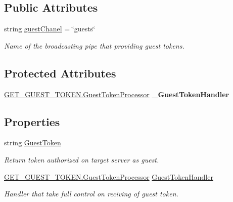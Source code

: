 \subsection*{Public Attributes}
\begin{DoxyCompactItemize}
\item 
string \mbox{\hyperlink{class_pipes_provider_1_1_networking_1_1_routing_1_1_partial_authorized_instruction_abda0735bb8ca245802008413dd50c863}{guest\+Chanel}} = \char`\"{}guests\char`\"{}
\begin{DoxyCompactList}\small\item\em Name of the broadcasting pipe that providing guest tokens. \end{DoxyCompactList}\end{DoxyCompactItemize}
\subsection*{Protected Attributes}
\begin{DoxyCompactItemize}
\item 
\mbox{\label{class_pipes_provider_1_1_networking_1_1_routing_1_1_partial_authorized_instruction_aef955c1b8751ba406a3b55a7155979c0}} 
\mbox{\hyperlink{class_base_queries_1_1_g_e_t___g_u_e_s_t___t_o_k_e_n_1_1_guest_token_processor}{G\+E\+T\+\_\+\+G\+U\+E\+S\+T\+\_\+\+T\+O\+K\+E\+N.\+Guest\+Token\+Processor}} {\bfseries \+\_\+\+Guest\+Token\+Handler}
\end{DoxyCompactItemize}
\subsection*{Properties}
\begin{DoxyCompactItemize}
\item 
string \mbox{\hyperlink{class_pipes_provider_1_1_networking_1_1_routing_1_1_partial_authorized_instruction_a0818427091144916faf74dab51ac1ba8}{Guest\+Token}}
\begin{DoxyCompactList}\small\item\em Return token authorized on target server as guest. \end{DoxyCompactList}\item 
\mbox{\hyperlink{class_base_queries_1_1_g_e_t___g_u_e_s_t___t_o_k_e_n_1_1_guest_token_processor}{G\+E\+T\+\_\+\+G\+U\+E\+S\+T\+\_\+\+T\+O\+K\+E\+N.\+Guest\+Token\+Processor}} \mbox{\hyperlink{class_pipes_provider_1_1_networking_1_1_routing_1_1_partial_authorized_instruction_a2449d0415992bc75cc854859cda8b0bf}{Guest\+Token\+Handler}}
\begin{DoxyCompactList}\small\item\em Handler that take full control on reciving of guest token. \end{DoxyCompactList}\end{DoxyCompactItemize}


